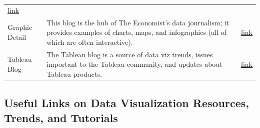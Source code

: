 \documentclass[]{book}
\theoremstyle{definition}
\theoremstyle{definition}
\theoremstyle{definition}
\theoremstyle{remark}
\begin{document}
\begin{longtable}[]{@{}lll@{}}
\begin{minipage}[t]{0.11\columnwidth}
\href{https://www.theatlas.com/}{link}\strut
\end{minipage}\tabularnewline
\begin{minipage}[t]{0.11\columnwidth}\raggedright\strut
Graphic Detail\strut
\end{minipage} & \begin{minipage}[t]{0.20\columnwidth}\raggedright\strut
This blog is the hub of The Economist's data journalism; it provides
examples of charts, maps, and infographics (all of which are often
interactive).\strut
\end{minipage} & \begin{minipage}[t]{0.11\columnwidth}\raggedright\strut
\href{https://www.economist.com/blogs/graphicdetail}{link}\strut
\end{minipage}\tabularnewline
\begin{minipage}[t]{0.11\columnwidth}\raggedright\strut
Tableau Blog\strut
\end{minipage} & \begin{minipage}[t]{0.20\columnwidth}\raggedright\strut
The Tableau blog is a source of data viz trends, issues important to the
Tableau community, and updates about Tableau products.\strut
\end{minipage} & \begin{minipage}[t]{0.11\columnwidth}\raggedright\strut
\href{https://www.tableau.com/about/blog}{link}\strut
\end{minipage}\tabularnewline
\bottomrule
\end{longtable}

\subsection{Useful Links on Data Visualization Resources, Trends, and
Tutorials}\label{useful-links-on-data-visualization-resources-trends-and-tutorials-1}
\end{document}
